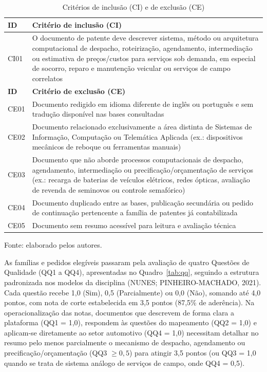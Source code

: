 \documentclass[12pt,a4paper]{article}
\begin{document}
\begin{table}[htbp]
\centering\small
\caption{Critérios de inclusão (CI) e de exclusão (CE)}\label{tab:cice}
\begin{tabular}{p{1.2cm}p{12.1cm}}
\toprule
\textbf{ID} & \textbf{Critério de inclusão (CI)}\\
\midrule
CI01 & O documento de patente deve descrever sistema, método ou arquitetura computacional de despacho, roteirização, agendamento, intermediação ou estimativa de preços/custos para serviços sob demanda, em especial de socorro, reparo e manutenção veicular ou serviços de campo correlatos\\
\midrule
\textbf{ID} & \textbf{Critério de exclusão (CE)}\\
\midrule
CE01 & Documento redigido em idioma diferente de inglês ou português e sem tradução disponível nas bases consultadas\\
CE02 & Documento relacionado exclusivamente a área distinta de Sistemas de Informação, Computação ou Telemática Aplicada (ex.: dispositivos mecânicos de reboque ou ferramentas manuais)\\
CE03 & Documento que não aborde processos computacionais de despacho, agendamento, intermediação ou precificação/orçamentação de serviços (ex.: recarga de baterias de veículos elétricos, redes ópticas, avaliação de revenda de seminovos ou controle semafórico)\\
CE04 & Documento duplicado entre as bases, publicação secundária ou pedido de continuação pertencente a família de patentes já contabilizada\\
CE05 & Documento sem resumo acessível para leitura e avaliação técnica\\
\bottomrule
\end{tabular}

\smallskip
\footnotesize Fonte: elaborado pelos autores.
\end{table}

As famílias e pedidos elegíveis passaram pela avaliação de quatro Questões de Qualidade (QQ1 a QQ4), apresentadas no Quadro~\ref{tab:qq}, seguindo a estrutura padronizada nos modelos da disciplina (NUNES; PINHEIRO-MACHADO, 2021). Cada questão recebe 1,0 (Sim), 0,5 (Parcialmente) ou 0,0 (Não), somando até 4,0 pontos, com nota de corte estabelecida em 3,5 pontos (87,5\% de aderência). Na operacionalização das notas, documentos que descrevem de forma clara a plataforma (QQ1 = 1,0), respondem às questões do mapeamento (QQ2 = 1,0) e aplicam-se diretamente ao setor automotivo (QQ4 = 1,0) necessitam detalhar no resumo pelo menos parcialmente o mecanismo de despacho, agendamento ou precificação/orçamentação (QQ3 $\ge 0{,}5$) para atingir 3,5 pontos (ou QQ3 = 1,0 quando se trata de sistema análogo de serviços de campo, onde QQ4 = 0,5).
\end{document}
